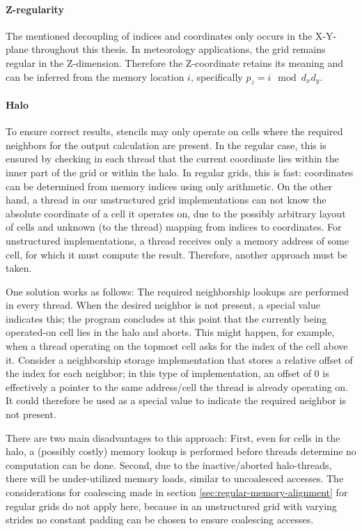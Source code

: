 \paragraph{Z-regularity} The mentioned decoupling of indices and coordinates only occurs in the X-Y-plane throughout this thesis. In meteorology applications, the grid remains regular in the Z-dimension. Therefore the Z-coordinate retains its meaning and can be inferred from the memory location $i$, specifically $p_z = i \mod d_xd_y$.

\paragraph{Halo} To ensure correct results, stencils may only operate on cells where the required neighbors for the output calculation are present. In the regular case, this is ensured by checking in each thread that the current coordinate lies within the inner part of the grid or within the halo. In regular grids, this is fast: coordinates can be determined from memory indices using only arithmetic. On the other hand, a thread in our unstructured grid implementations can not know the absolute coordinate of a cell it operates on, due to the possibly arbitrary layout of cells and unknown (to the thread) mapping from indices to coordinates. For unstructured implementations, a thread receives only a memory address of some cell, for which it must compute the result. Therefore, another approach must be taken.

One solution works as follows: The required neighborship lookups are performed in every thread. When the desired neighbor is not present, a special value indicates this; the program concludes at this point that the currently being operated-on cell lies in the halo and aborts. This might happen, for example, when a thread operating on the topmost cell asks for the index of the cell above it. Consider a neighborship storage implementation that stores a relative offset of the index for each neighbor; in this type of implementation, an offset of $0$ is effectively a pointer to the same address/cell the thread is already operating on. It could therefore be used as a special value to indicate the required neighbor is not present.

There are two main disadvantages to this approach: First, even for cells in the halo, a (possibly costly) memory lookup is performed before threads determine no computation can be done. Second, due to the inactive/aborted halo-threads, there will be under-utilized memory loads, similar to uncoalesced accesses. The considerations for coalescing made in section \ref{sec:regular-memory-alignment} for regular grids do not apply here, because  in an unstructured grid with varying strides no constant padding can be chosen to ensure coalescing accesses. 

